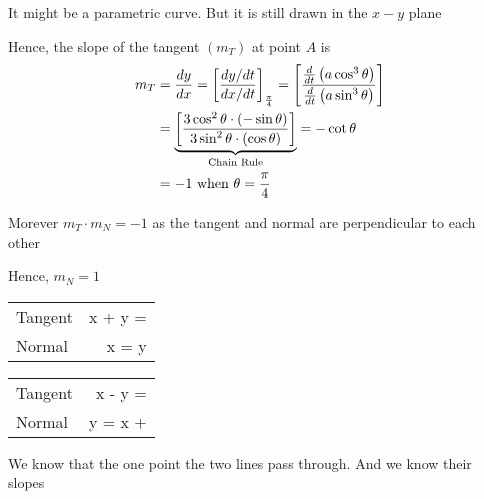 \documentclass[14pt,fleqn]{extarticle}
\newcommand\cx{a\sin^3\theta}
\newcommand\cy{a\cos^3\theta}
\begin{document}
\begin{problem}
\begin{step}
     \reason 
    
    It might be a parametric curve. But it is still drawn in the $x-y$ plane \newline 
    
    Hence, the slope of the tangent $(m_T)$ at point $A$ is
    \begin{align}
	m_T &= \dydx = \left[ \frac{dy / dt}{dx / dt}\right]_{\frac\pi{4}} 
	= \left[\frac{\frac{d}{dt} \left(\cy \right)}{\frac{d}{dt} \left(\cx \right)} \right]\\
	&= \underbrace{\left[\frac{3\cos^2\theta\cdot (-\sin\theta)}{3\sin^2\theta\cdot (\cos\theta)} \right]}_{\text{Chain Rule}} = -\cot\theta \\
	&= -1\text{ when } \theta = \frac\pi{4}
\end{align}

Morever $m_T\cdot m_N = -1$ as the tangent and normal are perpendicular to each other \newline 

Hence, $m_N = 1$ 
\end{step}

\begin{step}
  \begin{options} 
     \correct 
       
     \begin{center}
  \begin{tabular}{lN}
   \toprule
        &   \\
   \midrule 
   Tangent & x + y = \\
    \midrule 
    Normal & x = y \\ 
    \bottomrule
  \end{tabular}
\end{center}
     \incorrect
        
        \begin{center}
  \begin{tabular}{lN}
   \toprule
        &   \\
   \midrule 
   Tangent & x - y = \\
    \midrule 
    Normal & y = x +  \\ 
    \bottomrule
  \end{tabular}
\end{center}

    \end{options} 
     \reason 
     
     We know that the one point the two lines pass through. And we know their slopes\newline 
     

\end{step}
\end{problem}
\end{document}
